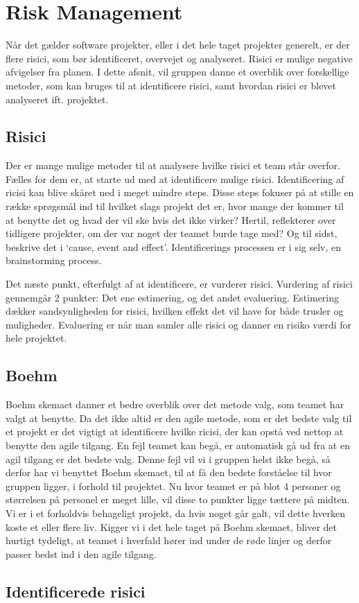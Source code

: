 \chapter{Risk Management}\label{ch:Risk Management}

Når det gælder software projekter, eller i det hele taget projekter generelt, er der flere risici, som bør identificeret, overvejet og analyseret. Risici er mulige negative afvigelser fra planen.\cite{SlideRiskAnalysis} I dette afsnit, vil gruppen danne et overblik over forskellige metoder, som kan bruges til at identificere risici, samt hvordan risici er blevet analyseret ift. projektet.

\section{Risici}

Der er mange mulige metoder til at analysere hvilke risici et team står overfor. Fælles for dem er, at starte ud med at identificere mulige risici.
Identificering af ricisi kan blive skåret ned i meget mindre steps. \cite{SlideRiskAnalysis} Disse steps fokuser på at stille en række sprøgsmål ind til hvilket slags projekt det er, hvor mange der kommer til at benytte det og hvad der vil ske hvis det ikke virker? Hertil, reflekterer over tidligere projekter, om der var noget der teamet burde tage med? Og til sidst, beskrive det i ‘cause, event and effect’. Identificerings processen er i sig selv, en brainstorming process.

Det næste punkt, efterfulgt af at identificere, er vurderer risici. Vurdering af risici gennemgår 2 punkter: Det ene estimering, og det andet evaluering. Estimering dækker sandsynligheden for risici, hvilken effekt det vil have for både trusler og muligheder. Evaluering er når man samler alle risici og danner en risiko værdi for hele projektet.


\section{Boehm}

Boehm skemaet danner et bedre overblik over det metode valg, som teamet har valgt at benytte. Da det ikke altid er den agile metode, som er det bedste valg til et projekt er det vigtigt at identificere hvilke ricisi, der kan opstå ved nettop at benytte den agile tilgang. En fejl teamet kan begå, er automatisk gå ud fra at en agil tilgang er det bedste valg. Denne fejl vil vi i gruppen helst ikke begå, så derfor har vi benyttet Boehm skemaet, til at få den bedste forståelse til hvor gruppen ligger, i forhold til projektet. 
Nu hvor teamet er på blot 4 personer og størrelsen på personel er meget lille, vil disse to punkter ligge tættere på midten. Vi er i et forholdvis behageligt projekt, da hvis noget går galt, vil dette hverken koste et eller flere liv. Kigger vi i det hele taget på Boehm skemaet, bliver det hurtigt tydeligt, at teamet i hverfald hører ind under de røde linjer og derfor passer bedst ind i den agile tilgang. 

\section{Identificerede risici}
